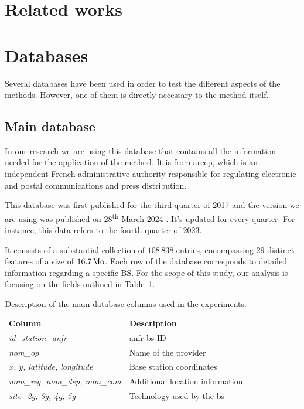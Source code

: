 \documentclass[lettersize,journal,english]{IEEEtran}
\begin{document}
\section{Related works\label{sec:rel_works}}
    \noindent

\section{Databases\label{sec:data}}
    \noindent Several databases have been used in order to test the different aspects of the methods. However, one of them is directly necessary to the method itself.

    \subsection{Main database}
        In our research we are using this database \cite{main_database} that contains all the information needed for the application of the method. It is from \acrfull{arcep}, which is an independent French administrative authority responsible for regulating electronic and postal communications and press distribution.

        This database was first published for the third quarter of 2017 and the version we are using was published on 28\textsuperscript{th} March 2024 \cite{main_database_hist}.
        It's updated for every quarter. For instance, this data refers to the fourth quarter of 2023.

        It consists of a substantial collection of $108\,838$ entries, encompassing $29$ distinct features of a size of $\unit[16.7]{Mo}$.
        Each row of the database corresponds to detailed information regarding a specific BS. For the scope of this study, our analysis is focusing on the fields outlined in Table~\ref{table:data_columns}.
        \begin{table}
            \centering
            \caption{Description of the main database columns used in the experiments.}
            \label{table:data_columns}
            \begin{tabular}{ll}
                \toprule
                \textbf{Column} & \textbf{Description} \\
                \cmidrule(lr){1-2}
                \textsl{id\_station\_anfr} & \acrshort{anfr} \acrshort{bs} ID \\ 
                \textsl{nom\_op} & Name of the provider \\
                \textsl{$x$, $y$, latitude, longitude} & Base station coordinates \\ 
                \textsl{nom\_reg, nom\_dep, nom\_com} & Additional location information \\  
                \textsl{site\_2g, 3g, 4g, 5g} & Technology used by the \acrshort{bs} \\ 
                \bottomrule
            \end{tabular}
        \end{table}
\end{document}
